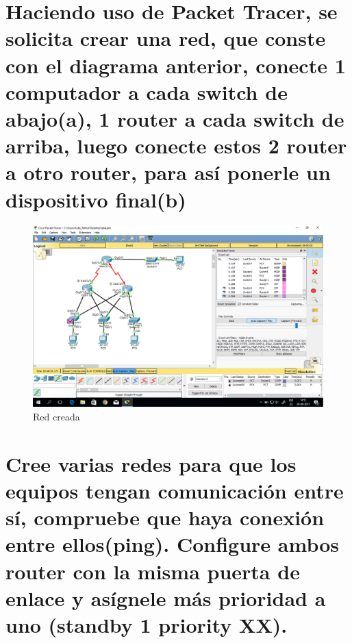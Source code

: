 \documentclass[11pt]{utalcaDoc}
\begin{document}
\section{Haciendo uso de Packet Tracer, se solicita crear una red, que conste con el diagrama anterior, conecte 1 computador a cada switch de abajo(a), 1 router a cada switch de arriba, luego conecte estos 2 router a otro router, para as\'i ponerle un dispositivo final(b)}


\begin{figure}[!ht]
  \centering
\includegraphics[scale=.3]{4} 
  \caption{Red creada}
  \label{FIGURE:4}
\end{figure}



\section{Cree varias redes para que los equipos tengan comunicaci\'on entre s\'i, compruebe que haya conexi\'on entre ellos(ping). Configure ambos router con la misma puerta de enlace y as\'ignele m\'as prioridad a uno (standby 1 priority XX).}
\end{document}
